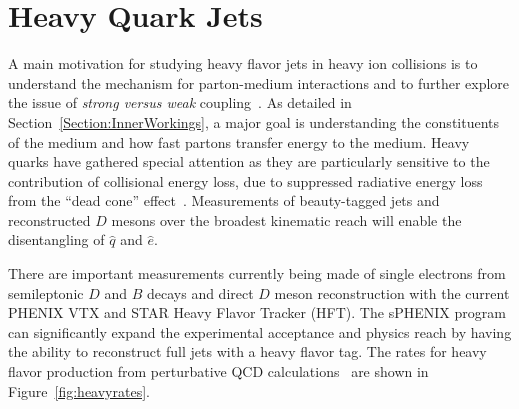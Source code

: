 


\section{Heavy Quark Jets}
\label{sec:heavyquark}

A main motivation for studying heavy flavor jets in heavy ion
collisions is to understand the mechanism for parton-medium
interactions and to further explore the issue of {\it strong versus weak} coupling~\cite{horowitz}.  
As detailed in Section~\ref{Section:InnerWorkings}, a major goal is understanding the constituents of the medium
and how fast partons transfer energy to the medium.   Heavy quarks have gathered special attention as they are 
particularly sensitive to the contribution of collisional energy loss, due to suppressed radiative energy loss from the
``dead cone'' effect~\cite{dk_dead_cone}.   Measurements of beauty-tagged jets and reconstructed $D$ mesons over the broadest
kinematic reach will enable the disentangling of $\hat{q}$ and $\hat{e}$.   

There are important measurements currently being made of single electrons from semileptonic $D$ and $B$ decays and direct $D$ meson 
reconstruction with the current PHENIX VTX and STAR Heavy Flavor Tracker (HFT).  The sPHENIX program can significantly expand 
the experimental acceptance and physics reach by having the ability to reconstruct full jets with a heavy flavor tag.
The rates for heavy flavor production from perturbative QCD calculations~\cite{Cacciariprivate} are shown in 
Figure~\ref{fig:heavyrates}.

